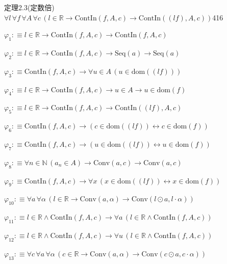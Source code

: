 \begin{fullproof}{定理2.3(定数倍)}{$\forall l\,\forall f\,\forall A\,\forall c\,(l \in \mathbb{R} \to \mathrm{ContIn}(f,A,c) \to \mathrm{ContIn}((l f),A,c))$}{416}
\begin{ptree}
\noLine
{}
\end{ptree}
\begin{abbrevlist}
\item $\varphi_{1} :\equiv l \in \mathbb{R} \to \mathrm{ContIn}(f,A,c) \to \mathrm{ContIn}(f,A,c)$
\item $\varphi_{2} :\equiv l \in \mathbb{R} \to \mathrm{ContIn}(f,A,c) \to \mathrm{Seq}(a) \to \mathrm{Seq}(a)$
\item $\varphi_{3} :\equiv \mathrm{ContIn}(f,A,c) \to \forall u \in A\,(u \in \mathrm{dom}((l f)))$
\item $\varphi_{4} :\equiv l \in \mathbb{R} \to \mathrm{ContIn}(f,A,c) \to u \in A \to u \in \mathrm{dom}(f)$
\item $\varphi_{5} :\equiv l \in \mathbb{R} \to \mathrm{ContIn}(f,A,c) \to \mathrm{ContIn}((l f),A,c)$
\item $\varphi_{6} :\equiv \mathrm{ContIn}(f,A,c) \to (c \in \mathrm{dom}((l f)) \leftrightarrow c \in \mathrm{dom}(f))$
\item $\varphi_{7} :\equiv \mathrm{ContIn}(f,A,c) \to (u \in \mathrm{dom}((l f)) \leftrightarrow u \in \mathrm{dom}(f))$
\item $\varphi_{8} :\equiv \forall n \in \mathbb{N}\,(a_{n} \in A) \to \mathrm{Conv}(a,c) \to \mathrm{Conv}(a,c)$
\item $\varphi_{9} :\equiv \mathrm{ContIn}(f,A,c) \to \forall x\,(x \in \mathrm{dom}((l f)) \leftrightarrow x \in \mathrm{dom}(f))$
\item $\varphi_{10} :\equiv \forall a\,\forall \alpha\,(l \in \mathbb{R} \to \mathrm{Conv}(a,\alpha) \to \mathrm{Conv}(l \odot a,l \cdot \alpha))$
\item $\varphi_{11} :\equiv l \in \mathbb{R} \land \mathrm{ContIn}(f,A,c) \to \forall a\,(l \in \mathbb{R} \land \mathrm{ContIn}(f,A,c))$
\item $\varphi_{12} :\equiv l \in \mathbb{R} \land \mathrm{ContIn}(f,A,c) \to \forall u\,(l \in \mathbb{R} \land \mathrm{ContIn}(f,A,c))$
\item $\varphi_{13} :\equiv \forall c\,\forall a\,\forall \alpha\,(c \in \mathbb{R} \to \mathrm{Conv}(a,\alpha) \to \mathrm{Conv}(c \odot a,c \cdot \alpha))$

\end{abbrevlist}
\end{fullproof}
